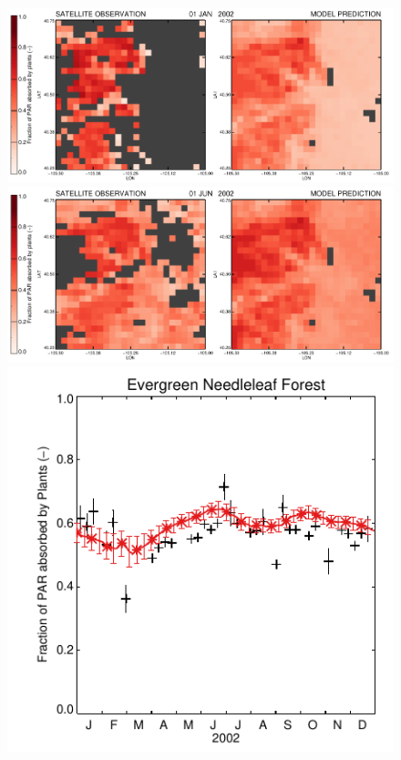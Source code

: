 \documentclass[a4paper,12pt]{article}
\begin{document}
\begin{figure}[hp]
\begin{center}
\includegraphics[scale=0.8]{Colorado_Front_Range.FPAR.test.20020101.pdf}
\includegraphics[scale=0.8]{Colorado_Front_Range.FPAR.test.20020601.pdf}
\includegraphics[scale=0.8]{ENF.FPAR.test.2002.pdf}

\end{center}
\end{figure}
\end{document}
